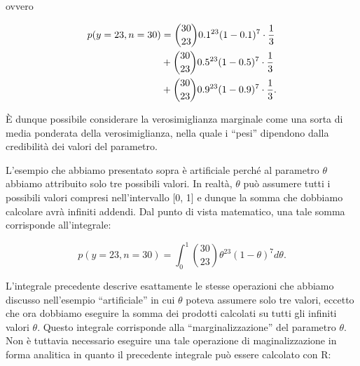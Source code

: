 \documentclass[
]{memoir}
\newenvironment{Shaded}{\begin{snugshade}}{\end{snugshade}}
\newcommand{\AttributeTok}[1]{\textcolor[rgb]{0.77,0.63,0.00}{#1}}
\newcommand{\CommentTok}[1]{\textcolor[rgb]{0.56,0.35,0.01}{\textit{#1}}}
\newcommand{\ControlFlowTok}[1]{\textcolor[rgb]{0.13,0.29,0.53}{\textbf{#1}}}
\newcommand{\DecValTok}[1]{\textcolor[rgb]{0.00,0.00,0.81}{#1}}
\newcommand{\FunctionTok}[1]{\textcolor[rgb]{0.00,0.00,0.00}{#1}}
\newcommand{\NormalTok}[1]{#1}
\newcommand{\OtherTok}[1]{\textcolor[rgb]{0.56,0.35,0.01}{#1}}
\newcommand{\SpecialCharTok}[1]{\textcolor[rgb]{0.00,0.00,0.00}{#1}}
\theoremstyle{definition}
\theoremstyle{definition}
\theoremstyle{definition}
\theoremstyle{definition}
\theoremstyle{remark}
\begin{document}
\noindent
ovvero

\begin{align}
p(y = 23, n = 30) &= \binom{30}{23} 0.1^{23} (1-0.1)^{7} \cdot \frac{1}{3} \notag\\
&+ \binom{30}{23} 0.5^{23} (1-0.5)^{7} \cdot \frac{1}{3} \notag\\
&+ \binom{30}{23} 0.9^{23} (1-0.9)^{7} \cdot \frac{1}{3} \notag.
\end{align}

È dunque possibile considerare la verosimiglianza marginale come una sorta di media ponderata della verosimiglianza, nella quale i ``pesi'' dipendono dalla credibilità dei valori del parametro.

L'esempio che abbiamo presentato sopra è artificiale perché al parametro \(\theta\) abbiamo attribuito solo tre possibili valori. In realtà, \(\theta\) può assumere tutti i possibili valori compresi nell'intervallo {[}0, 1{]} e dunque la somma che dobbiamo calcolare avrà infiniti addendi. Dal punto di vista matematico, una tale somma corrisponde all'integrale:

\[
p(y = 23, n = 30) = \int_0^1 \binom{30}{23} \theta^{23} (1-\theta)^{7} d\theta.
\]

\noindent
L'integrale precedente descrive esattamente le stesse operazioni che abbiamo discusso nell'esempio ``artificiale'' in cui \(\theta\) poteva assumere solo tre valori, eccetto che ora dobbiamo eseguire la somma dei prodotti calcolati su tutti gli infiniti valori \(\theta\). Questo integrale corrisponde alla ``marginalizzazione'' del parametro \(\theta\). Non è tuttavia necessario eseguire una tale operazione di maginalizzazione in forma analitica in quanto il precedente integrale può essere calcolato con R:

\begin{Shaded}
\end{Shaded}
\end{document}
